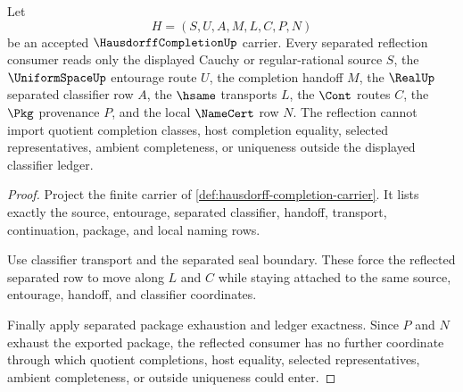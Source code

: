 \begin{theorem}
\label{thm:hausdorffcompletion-separated-reflection}
Let
$$
H=(S,U,A,M,L,C,P,N)
$$
be an accepted $\HausdorffCompletionUp$ carrier. Every separated reflection consumer reads only the displayed Cauchy or regular-rational source $S$, the $\UniformSpaceUp$ entourage route $U$, the completion handoff $M$, the $\RealUp$ separated classifier row $A$, the $\hsame$ transports $L$, the $\Cont$ routes $C$, the $\Pkg$ provenance $P$, and the local $\NameCert$ row $N$. The reflection cannot import quotient completion classes, host completion equality, selected representatives, ambient completeness, or uniqueness outside the displayed classifier ledger.
\end{theorem}
\begin{proof}
Project the finite carrier of \autoref{def:hausdorff-completion-carrier}. It lists exactly the source, entourage, separated classifier, handoff, transport, continuation, package, and local naming rows.

Use classifier transport and the separated seal boundary. These force the reflected separated row to move along $L$ and $C$ while staying attached to the same source, entourage, handoff, and classifier coordinates.

Finally apply separated package exhaustion and ledger exactness. Since $P$ and $N$ exhaust the exported package, the reflected consumer has no further coordinate through which quotient completions, host equality, selected representatives, ambient completeness, or outside uniqueness could enter.
\end{proof}

